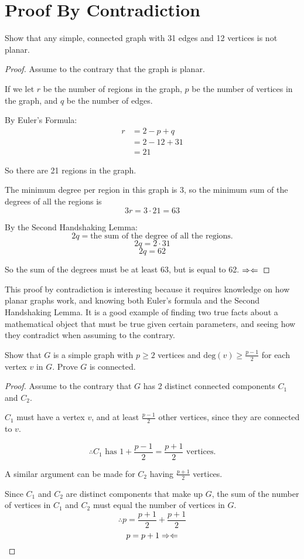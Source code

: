 \documentclass[12pt]{article}
\begin{document}
\newpage
\section{Proof By Contradiction}

Show that any simple, connected graph with 31 edges and 12 vertices is not planar.

\begin{proof}
Assume to the contrary that the graph is planar.

If we let $r$ be the number of regions in the graph, $p$ be the number of vertices in the graph, and $q$ be the number of edges.

By Euler's Formula:
\begin{align*}
r &= 2 - p + q\\
&= 2 - 12 + 31\\
&= 21
\end{align*}

So there are 21 regions in the graph.

The minimum degree per region in this graph is 3, so the minimum sum of the degrees of all the regions is
$$3r = 3 \cdot 21 = 63$$

By the Second Handshaking Lemma:
$$2q = \text{the sum of the degree of all the regions.}$$
$$2q = 2 \cdot 31$$
$$2q = 62$$

So the sum of the degrees must be at least 63, but is equal to 62. $\Rightarrow\Leftarrow$

\end{proof}

\par
This proof by contradiction is interesting because it requires knowledge on how planar graphs work, and knowing both Euler's formula and the Second Handshaking Lemma. It is a good example of finding two true facts about a mathematical object that must be true given certain parameters, and seeing how they contradict when assuming to the contrary.

\newpage
\begin{flushleft}
Show that $G$ is a simple graph with $p \geq 2$ vertices and $\text{deg}(v)\geq\frac{p - 1}{2}$ for each vertex $v$ in $G$. Prove $G$ is connected.
\end{flushleft}

\begin{proof}
Assume to the contrary that $G$ has 2 distinct connected components $C_1$ and $C_2$.

$C_1$ must have a vertex $v$, and at least $\frac{p-1}{2}$ other vertices, since they are connected to $v$. 

$$\therefore C_1 \text{ has } 1 + \frac{p-1}{2} = \frac{p+1}{2} \text{ vertices.}$$

A similar argument can be made for $C_2$ having $\frac{p+1}{2}$ vertices.

Since $C_1$ and $C_2$ are distinct components that make up $G$, the sum of the number of vertices in $C_1$ and $C_2$ must equal the number of vertices in $G$.
$$\therefore p = \frac{p+1}{2} + \frac{p + 1}{2}$$
$$p = p + 1 \Rightarrow\Leftarrow$$

\end{proof}
\end{document}
